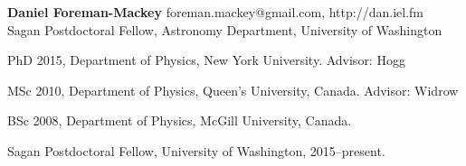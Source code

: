 \documentclass[12pt,letterpaper]{article}
\begin{document}
\thispagestyle{empty}\sloppy\sloppypar\raggedbottom

\textbf{\Large Daniel Foreman-Mackey} \hfill
\textsf{\small foreman.mackey@gmail.com, http://dan.iel.fm} \\[0.5ex]
Sagan Postdoctoral Fellow, Astronomy Department, University of Washington\\[0.5ex]

\begin{list}{}{\cvlist}
\item
PhD 2015, Department of Physics, New York University. Advisor: Hogg
\item
MSc 2010, Department of Physics, Queen's University, Canada. Advisor: Widrow
\item
BSc 2008, Department of Physics, McGill University, Canada.
\end{list}

\begin{list}{}{\cvlist}
\item
Sagan Postdoctoral Fellow, University of Washington, 2015--present.
\end{list}

\ifdefined\withpubs
    

    \begin{list}{}{\cvlist}
    
    \end{list}

    \begin{list}{}{\cvlist}
    
    \end{list}
\fi
\end{document}
